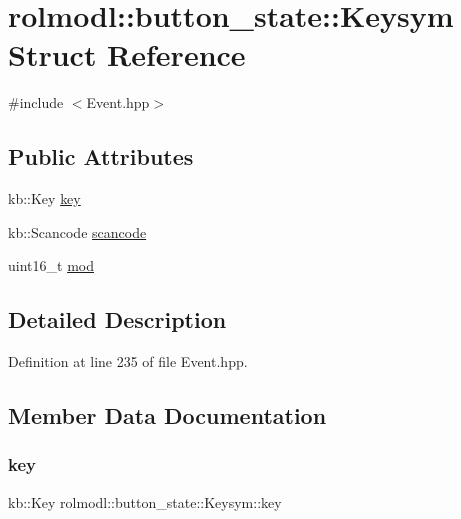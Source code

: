 \hypertarget{structrolmodl_1_1button__state_1_1_keysym}{}\section{rolmodl\+::button\+\_\+state\+::Keysym Struct Reference}
\label{structrolmodl_1_1button__state_1_1_keysym}


{\ttfamily \#include $<$Event.\+hpp$>$}

\subsection*{Public Attributes}
\begin{DoxyCompactItemize}
\item 
kb\+::\+Key \mbox{\hyperlink{structrolmodl_1_1button__state_1_1_keysym_a91225bbe762a96a79a0fa133e2e67c06}{key}}
\item 
kb\+::\+Scancode \mbox{\hyperlink{structrolmodl_1_1button__state_1_1_keysym_a376dfa81769a2583d381ca795f75472a}{scancode}}
\item 
uint16\+\_\+t \mbox{\hyperlink{structrolmodl_1_1button__state_1_1_keysym_a4a10ef140948224bdf74daca79251446}{mod}}
\end{DoxyCompactItemize}


\subsection{Detailed Description}


Definition at line 235 of file Event.\+hpp.



\subsection{Member Data Documentation}
\mbox{\label{structrolmodl_1_1button__state_1_1_keysym_a91225bbe762a96a79a0fa133e2e67c06}} 
\subsubsection{\texorpdfstring{key}{key}}
{\footnotesize\ttfamily kb\+::\+Key rolmodl\+::button\+\_\+state\+::\+Keysym\+::key}




